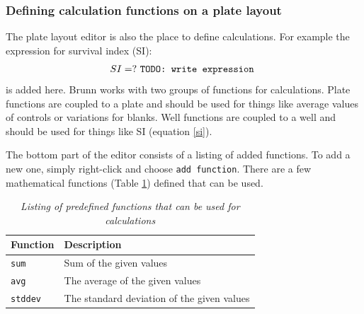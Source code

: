 \documentclass[a4paper,10pt]{article}
\begin{document}
            \subsubsection{Defining calculation functions on a plate layout}
                The plate layout editor is also the place to define
                calculations. For example the expression for survival index
                (SI):
                \begin{equation} SI = ? \mbox{ \texttt{TODO: write expression} }
                \label{si} \end{equation}
                is added here. Brunn works with two groups of functions for
                calculations. Plate functions are coupled to a plate and should
                be used for things like average values of controls or
                variations for blanks. Well functions are coupled to a well and
                should be used for things like SI (equation \ref{si}).
                
                The bottom part of the editor consists of a listing of added
                functions. To add a new one, simply right-click and choose
                \texttt{add function}. There are a few mathematical functions
                (Table \ref{functions}) defined that can be used. 

                \begin{table}
                    \begin{center}
                        \begin{tabular}{l|l}
                            Function & Description \\
                            \hline
                            \texttt{sum} &    Sum of the given values \\
                            \texttt{avg} &    The average of the
                                              given values \\
                            \texttt{stddev} & The standard deviation 
                                              of the given values \\
                        \end{tabular}
                    \end{center}
                    \caption{\textit{Listing of predefined functions that can
                                     be used for calculations}}
                    \label{functions}
                \end{table}
                
\end{document}
